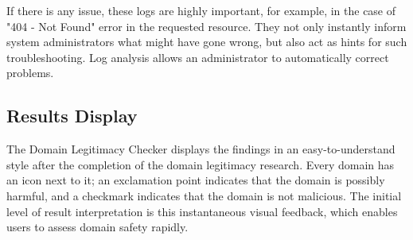 If there is any issue, these logs are highly important, for example, in the case of "404 - Not Found" error in the requested resource. They not only instantly inform system administrators what might have gone wrong, but also act as hints for such troubleshooting. Log analysis allows an administrator to automatically correct problems.

\subsection{Results Display}

The Domain Legitimacy Checker displays the findings in an easy-to-understand style after the completion of the domain legitimacy research. Every domain has an icon next to it; an exclamation point indicates that the domain is possibly harmful, and a checkmark indicates that the domain is not malicious. The initial level of result interpretation is this instantaneous visual feedback, which enables users to assess domain safety rapidly.

